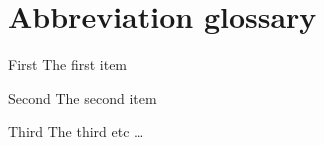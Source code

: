 \chapter{Abbreviation glossary}

\begin{nicgloss}
  \item[First] The first item
  \item[Second] The second item
  \item[Third] The third etc \ldots
\end{nicgloss}